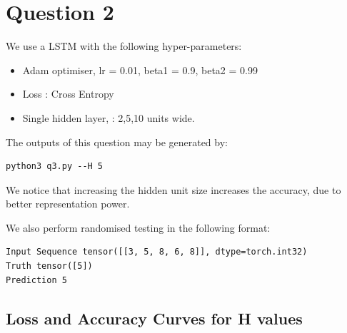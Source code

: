 \section{Question 2 }

We use a LSTM with the following hyper-parameters:

\begin{itemize}
\item  Adam optimiser, lr = 0.01, beta1 = 0.9, beta2 = 0.99
\item  Loss : Cross Entropy
\item  Single hidden layer, : 2,5,10 units wide.
\end{itemize}

The outputs of this question may be generated by:

\begin{lstlisting}
python3 q3.py --H 5
\end{lstlisting} 

We notice that increasing the hidden unit size increases the accuracy, due to better representation power.

We also perform randomised testing in the following format:\\
\begin{lstlisting}
Input Sequence tensor([[3, 5, 8, 6, 8]], dtype=torch.int32)
Truth tensor([5])
Prediction 5
\end{lstlisting}

\subsection{Loss and Accuracy Curves for H values}


